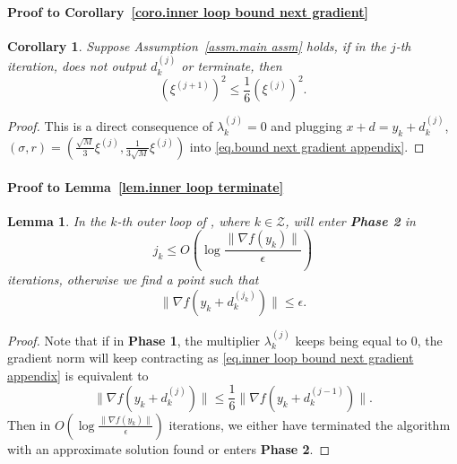 \documentclass{article}
\theoremstyle{plain}
\newtheorem{lemma}[theorem]{Lemma}
\newtheorem{corollary}[theorem]{Corollary}
\theoremstyle{definition}
\theoremstyle{remark}
\begin{document}
\paragraph{Proof to Corollary~\ref{coro.inner loop bound next gradient}}
\begin{corollary}
    \label{coro.inner loop bound next gradient appendix}
    Suppose Assumption~\ref{assm.main assm} holds, if in the $j$-th iteration,  does not output $d_k^{(j)}$ or terminate, then
    \begin{equation}
        \label{eq.inner loop bound next gradient appendix}
        \left(\xi^{(j+1)}\right)^2 \leq \frac{1}{6}\left(\xi^{(j)}\right)^2.
    \end{equation}
\end{corollary}
\begin{proof}
    This is a direct consequence of $\lambda_k^{(j)}=0$ and plugging $x+d = y_k+d_k^{(j)}$, $(\sigma,r) = \left(\frac{\sqrt{M}}{3}\xi^{(j)},\frac{1}{3\sqrt{M}}\xi^{(j)}\right)$ into \eqref{eq.bound next gradient appendix}.
\end{proof}
\paragraph{Proof to Lemma~\ref{lem.inner loop terminate}}
\begin{lemma}
    \label{lem.inner loop terminate appendix}
    In the $k$-th outer loop of , where $k\in\mathcal{Z}$,  will enter \textbf{Phase 2} in
    \begin{equation*}
        j_k \leq O\left (\log \frac{\|\nabla f(y_k)\|}{\epsilon}\right)
    \end{equation*}
    iterations, otherwise we find a point such that
    \begin{equation*}
        \| \nabla f(y_k+d_k^{(j_k)})\| \leq \epsilon.
    \end{equation*}
\end{lemma}
\begin{proof}
    Note that if in \textbf{Phase 1}, the multiplier $\lambda_k^{(j)}$ keeps being equal to $0$, the gradient norm will keep contracting as \eqref{eq.inner loop bound next gradient appendix} is equivalent to
    \begin{equation*}
        \|\nabla f(y_k+d_k^{(j)})\|\leq \frac{1}{6}\|\nabla f(y_k+d_k^{(j-1)})\|.
    \end{equation*}
    Then in $O\left (\log \frac{\|\nabla f(y_k)\|}{\epsilon}\right)$ iterations, we either have terminated the algorithm with an approximate solution found or  enters \textbf{Phase 2}.
\end{proof}
\end{document}
